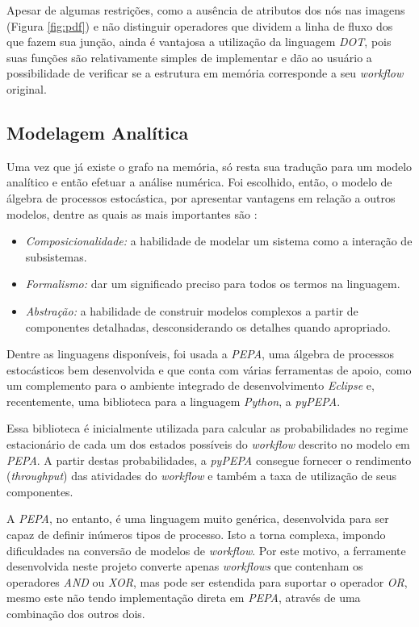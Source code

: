 \documentclass[a4paper,11pt]{article}
\begin{document}
  		Apesar de algumas restrições, como a ausência de atributos dos nós nas imagens (Figura \ref{fig:pdf}) e n\~ao distinguir operadores que dividem a linha de fluxo dos que fazem sua junç\~ao, ainda é vantajosa a utilização da linguagem \emph{DOT}, pois suas funções são relativamente simples de implementar e dão ao usuário a possibilidade de verificar se a estrutura em memória corresponde a seu \emph{workflow} original.

    \newpage
  	\subsection{Modelagem Analítica}
  		Uma vez que já existe o grafo na memória, só resta sua tradução para um modelo analítico e então efetuar a análise numérica. Foi escolhido, então, o modelo de álgebra de processos estocástica, por apresentar vantagens em relação a outros modelos, dentre as quais as mais importantes são \cite{web:aboutpepa}:

  		\begin{itemize}
  			\item \emph{Composicionalidade:} a habilidade de modelar um sistema como a interação de subsistemas.
  			\item \emph{Formalismo:} dar um significado preciso para todos os termos na linguagem.
  			\item \emph{Abstração:} a habilidade de construir modelos complexos a partir de componentes detalhadas, desconsiderando os detalhes quando apropriado.
  		\end{itemize}

		    Dentre as linguagens disponíveis, foi usada a \emph{PEPA}, uma álgebra de processos estocásticos bem desenvolvida e que conta com várias ferramentas de apoio, como um complemento para o ambiente integrado de desenvolvimento \emph{Eclipse} e, recentemente, uma biblioteca para a linguagem \emph{Python}, a \emph{pyPEPA}. 

        Essa biblioteca \'e inicialmente utilizada para calcular as probabilidades no regime estacion\'ario de cada um dos estados poss\'iveis do \emph{workflow} descrito no modelo em \emph{PEPA}. A partir destas probabilidades, a \emph{pyPEPA} consegue fornecer o rendimento (\emph{throughput}) das atividades do \emph{workflow} e também a taxa de utilizaç\~ao de seus componentes.

        A \emph{PEPA}, no entanto, \'e uma linguagem muito gen\'erica, desenvolvida para ser capaz de definir in\'umeros tipos de processo. Isto a torna complexa, impondo dificuldades na convers\~ao de modelos de \emph{workflow}. Por este motivo, a ferramente desenvolvida neste projeto converte apenas \emph{workflows} que contenham os operadores \emph{AND} ou \emph{XOR}, mas pode ser estendida para suportar o operador \emph{OR}, mesmo este n\~ao tendo implementação direta em \emph{PEPA}, atrav\'es de uma combinaç\~ao dos outros dois.
\end{document}
